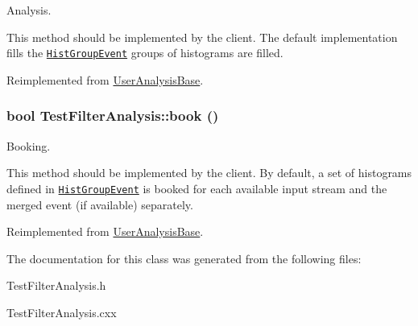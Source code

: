 Analysis. 

This method should be implemented by the client. The default implementation fills the {\tt \hyperlink{classHistGroupEvent}{Hist\-Group\-Event}} groups of histograms are filled. 

Reimplemented from \hyperlink{classUserAnalysisBase_015733b03dfc2596dfaf1841ca60a0b8}{User\-Analysis\-Base}.\hypertarget{classTestFilterAnalysis_b277393b1e443de3c4f12e0c54a72694}{
\subsubsection[book]{\setlength{\rightskip}{0pt plus 5cm}bool Test\-Filter\-Analysis::book ()}}
\label{classTestFilterAnalysis_b277393b1e443de3c4f12e0c54a72694}


Booking. 

This method should be implemented by the client. By default, a set of histograms defined in {\tt \hyperlink{classHistGroupEvent}{Hist\-Group\-Event}} is booked for each available input stream and the merged event (if available) separately. 

Reimplemented from \hyperlink{classUserAnalysisBase_4ed3754992929a1aeb1e938b31ec22af}{User\-Analysis\-Base}.

The documentation for this class was generated from the following files:\begin{CompactItemize}
\item 
Test\-Filter\-Analysis.h\item 
Test\-Filter\-Analysis.cxx\end{CompactItemize}
